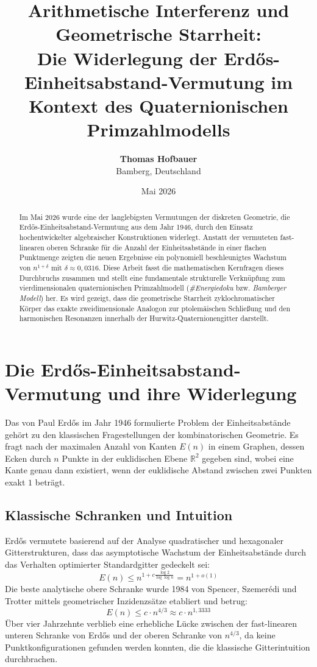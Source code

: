 \documentclass[11pt,a4paper]{article}
\title{\textbf{Arithmetische Interferenz und Geometrische Starrheit: \\ Die Widerlegung der Erd\H{o}s-Einheitsabstand-Vermutung im Kontext des Quaternionischen Primzahlmodells}}
\author{\textbf{Thomas Hofbauer} \\ Bamberg, Deutschland}
\date{Mai 2026}
\begin{document}
\maketitle

\begin{abstract}
Im Mai 2026 wurde eine der langlebigsten Vermutungen der diskreten Geometrie, die Erd\H{o}s-Einheitsabstand-Vermutung aus dem Jahr 1946, durch den Einsatz hochentwickelter algebraischer Konstruktionen widerlegt. Anstatt der vermuteten fast-linearen oberen Schranke für die Anzahl der Einheitsabstände in einer flachen Punktmenge zeigten die neuen Ergebnisse ein polynomiell beschleunigtes Wachstum von $n^{1+\delta}$ mit $\delta \approx 0,0316$. Diese Arbeit fasst die mathematischen Kernfragen dieses Durchbruchs zusammen und stellt eine fundamentale strukturelle Verknüpfung zum vierdimensionalen quaternionischen Primzahlmodell (\textit{\#Energiedoku} bzw. \textit{Bamberger Modell}) her. Es wird gezeigt, dass die geometrische Starrheit zyklochromatischer Körper das exakte zweidimensionale Analogon zur ptolemäischen Schließung und den harmonischen Resonanzen innerhalb der Hurwitz-Quaternionengitter darstellt.
\end{abstract}

\section{Die Erd\H{o}s-Einheitsabstand-Vermutung und ihre Widerlegung}
Das von Paul Erd\H{o}s im Jahr 1946 formulierte Problem der Einheitsabstände gehört zu den klassischen Fragestellungen der kombinatorischen Geometrie. Es fragt nach der maximalen Anzahl von Kanten $E(n)$ in einem Graphen, dessen Ecken durch $n$ Punkte in der euklidischen Ebene $\mathbb{R}^2$ gegeben sind, wobei eine Kante genau dann existiert, wenn der euklidische Abstand zwischen zwei Punkten exakt $1$ beträgt.

\subsection{Klassische Schranken und Intuition}
Erd\H{o}s vermutete basierend auf der Analyse quadratischer und hexagonaler Gitterstrukturen, dass das asymptotische Wachstum der Einheitsabstände durch das Verhalten optimierter Standardgitter gedeckelt sei:
\begin{equation}
E(n) \le n^{1 + c \frac{\log 2}{\log \log n}} = n^{1 + o(1)}
\end{equation}
Die beste analytische obere Schranke wurde 1984 von Spencer, Szemerédi und Trotter mittels geometrischer Inzidenzsätze etabliert und betrug:
\begin{equation}
E(n) \le c \cdot n^{4/3} \approx c \cdot n^{1,3333}
\end{equation}
Über vier Jahrzehnte verblieb eine erhebliche Lücke zwischen der fast-linearen unteren Schranke von Erd\H{o}s und der oberen Schranke von $n^{4/3}$, da keine Punktkonfigurationen gefunden werden konnten, die die klassische Gitterintuition durchbrachen.
\end{document}
